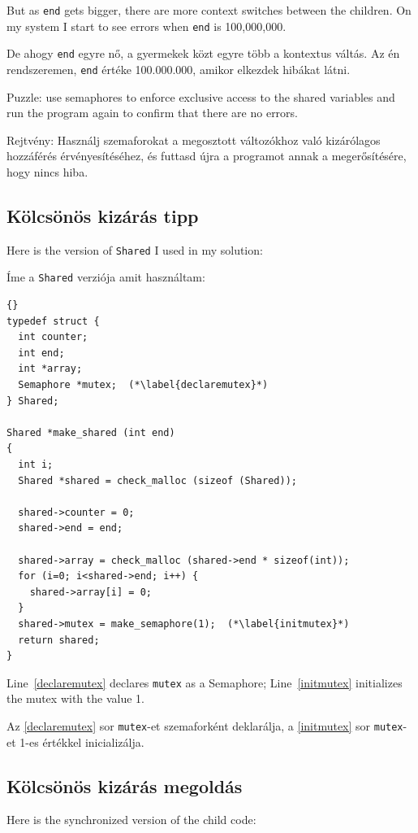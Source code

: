 \documentclass{book}
\newcommand{\clearemptydoublepage}{\newpage\cleardoublepage}
\begin{document}
But as {\tt end} gets bigger, there are more context switches between
the children.  On my system I start to see errors when
{\tt end} is 100,000,000.

De ahogy {\tt end} egyre nő, a gyermekek közt egyre
több a kontextus váltás. Az én rendszeremen,
{\tt end} értéke 100{.}000{.}000, amikor elkezdek hibákat látni.

Puzzle: use semaphores to enforce exclusive access to the shared
variables and run the program again to confirm that there are
no errors.

Rejtvény: Használj szemaforokat a megosztott változókhoz való kizárólagos hozzáférés érvényesítéséhez,
és futtasd újra a programot annak a megerősítésére, hogy nincs hiba.

\clearemptydoublepage
\subsection{Kölcsönös kizárás tipp}

Here is the version of {\tt Shared} I used in my solution:

Íme a {\tt Shared} verziója amit használtam:

\begin{lstlisting}[title={}]{}
typedef struct {
  int counter;
  int end;
  int *array;
  Semaphore *mutex;  (*\label{declaremutex}*)
} Shared;

Shared *make_shared (int end)
{
  int i;
  Shared *shared = check_malloc (sizeof (Shared));

  shared->counter = 0;
  shared->end = end;

  shared->array = check_malloc (shared->end * sizeof(int));
  for (i=0; i<shared->end; i++) {
    shared->array[i] = 0;
  }
  shared->mutex = make_semaphore(1);  (*\label{initmutex}*)
  return shared;
}
\end{lstlisting}

Line~\ref{declaremutex} declares {\tt mutex} as a Semaphore;
Line~\ref{initmutex} initializes the mutex with the value 1.

Az \ref{declaremutex} sor {\tt mutex}-et szemaforként deklarálja,
a \ref{initmutex} sor {\tt mutex}-et 1-es értékkel inicializálja.

\clearemptydoublepage
\subsection{Kölcsönös kizárás megoldás}

Here is the synchronized version of the child code:
\end{document}
